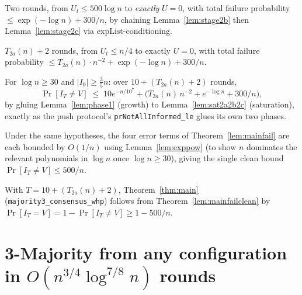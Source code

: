 \begin{lemma}\label{lem:sat2b2c}
  \leanok
  Two rounds, from $U_t\le500\log n$ to \emph{exactly} $U=0$, with total
  failure probability $\le\exp(-\log n)+300/n$, by chaining
  Lemma~\ref{lem:stage2b} then Lemma~\ref{lem:stage2c} via
  $\mathrm{expList}$-conditioning.
\end{lemma}

\begin{lemma}\label{lem:sat2a2b2c}
  \leanok
  $T_{2a}(n)+2$ rounds, from $U_t\le n/4$ to exactly $U=0$, with total
  failure probability $\le T_{2a}(n)\cdot n^{-2} + \exp(-\log n) + 300/n$.
\end{lemma}

\begin{theorem}\label{lem:mainfail}
  \leanok
  For $\log n\ge30$ and $|I_0|\ge\tfrac35n$: over $10+(T_{2a}(n)+2)$
  rounds,
  \[
    \Pr[I_T\ne V] \;\le\; 10e^{-n/10^7}
      + \bigl(T_{2a}(n)\,n^{-2} + e^{-\log n} + 300/n\bigr),
  \]
  by gluing Lemma~\ref{lem:phase1} (growth) to
  Lemma~\ref{lem:sat2a2b2c} (saturation), exactly as the push protocol's
  \texttt{prNotAllInformed\_le} glues its own two phases.
\end{theorem}

\begin{theorem}\label{lem:mainfailclean}
  \leanok
  Under the same hypotheses, the four error terms of
  Theorem~\ref{lem:mainfail} are each bounded by $O(1/n)$ using
  Lemma~\ref{lem:exppow} (to show $n$ dominates the relevant polynomials in
  $\log n$ once $\log n\ge30$), giving the single clean bound
  $\Pr[I_T\ne V] \le 500/n$.
\end{theorem}

With $T = 10+(T_{2a}(n)+2)$, Theorem~\ref{thm:main}
(\texttt{majority3\_consensus\_whp}) follows from
Theorem~\ref{lem:mainfailclean} by
$\Pr[I_T=V] = 1-\Pr[I_T\ne V] \ge 1-500/n$.

\section{\texorpdfstring{3-Majority from any configuration in $O(n^{3/4}\log^{7/8} n)$ rounds}{3-Majority from any configuration}}\label{sec:bcekmn-any-start}

